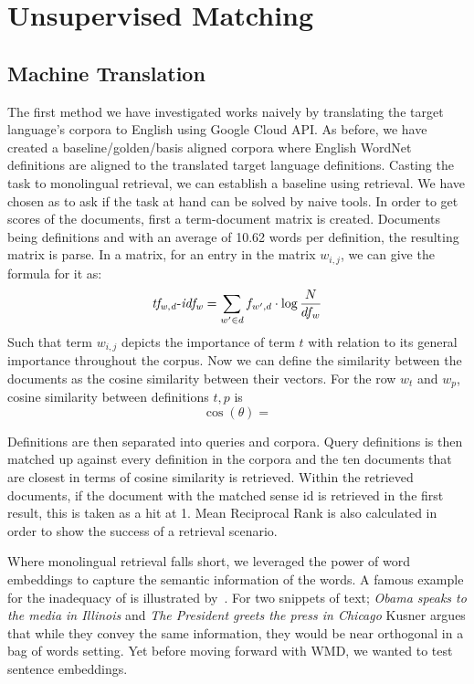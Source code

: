 \chapter{Unsupervised Matching}%
\label{chap:unsupervised_matching}

\section{Machine Translation}

The first method we have investigated works naively by translating the target language's corpora to English using Google Cloud API\@. %
As before, we have created a baseline/golden/basis aligned corpora where English WordNet definitions are aligned to the translated target language definitions.
Casting the task to monolingual retrieval, we can establish a baseline using \tfidf{} retrieval.
We have chosen \tfidf{} as to ask if the task at hand can be solved by naive tools.
In order to get \tfidf{} scores of the documents, first a term-document matrix is created.
Documents being definitions and with an average of 10.62 words per definition, the resulting matrix is parse.
In a \tfidf{} matrix, for an entry in the matrix $w_{i,j}$, we can give the formula for it as:
\begin{equation*}
    {\operatorname{\mathit{tf_{w,d}-idf_{w}}}} = {\sum_{w' \in d}{f_{w',d}}} \cdot \log \frac {N} {df_w}
\end{equation*}
Such that term $w_{i,j}$ depicts the importance of term $t$ with relation to its general importance throughout the corpus.
Now we can define the similarity between the documents as the cosine similarity between their \tfidf{} vectors.
For the row $w_t$ and $w_p$, cosine similarity between definitions $t, p$ is
\begin{equation*}
    \cos(\theta) =
\end{equation*}

Definitions are then separated into queries and corpora.
Query definitions is then matched up against every definition in the corpora and the ten documents that are closest in terms of cosine similarity is retrieved.
Within the retrieved documents, if the document with the matched sense id is retrieved in the first result, this is taken as a hit at 1.
Mean Reciprocal Rank is also calculated in order to show the success of a retrieval scenario.

Where monolingual retrieval falls short, we leveraged the power of word embeddings to capture the semantic information of the words.
A famous example for the inadequacy of \tfidf{} is illustrated by~\cite{kusner_word_2015}.
For two snippets of text; \emph{Obama speaks to the media in Illinois} and \emph{The President greets the press in Chicago} Kusner argues that while they convey the same information, they would be near orthogonal in a bag of words setting.
Yet before moving forward with WMD, we wanted to test sentence embeddings.

